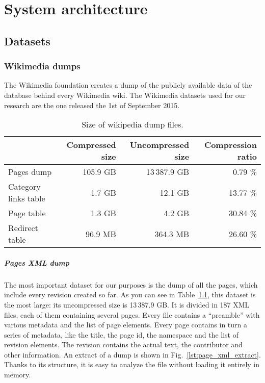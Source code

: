 
\chapter{System architecture}
\label{cha:system_architecture}

\section{Datasets}
\label{sec:datasets}

\subsection{Wikimedia dumps}
The Wikimedia foundation creates a dump of the publicly available data of the database behind every Wikimedia wiki.
The Wikimedia datasets used for our research are the one released the 1st of September 2015.


\begin{table}[]
\centering
\caption{Size of wikipedia dump files.}
\label{tbl:wikidumps_size}
\begin{tabular}{@{}lrrr@{}}
\multicolumn{1}{c}{\textbf{}} & \textbf{Compressed size} & \textbf{Uncompressed size} & \textbf{Compression ratio} \\ \midrule
Pages dump              &     105.9 GB &   13\,387.9 GB &  0.79 \% \\
Category links table    &       1.7 GB &        12.1 GB & 13.77 \% \\
Page table              &       1.3 GB &         4.2 GB & 30.84 \% \\
Redirect table          &      96.9 MB &       364.3 MB & 26.60 \%
\end{tabular}
\end{table}

\paragraph{Pages XML dump}
The most important dataset for our purposes is the dump of all the pages, which include every revision created so far.
As you can see in Table~\ref{tbl:wikidumps_size}, this dataset is the most large: its uncompressed size is 13\,387.9 GB\@.
It is divided in 187 XML files, each of them containing several pages.
Every file contains a ``preamble'' with various metadata and the list of page elements.
Every page contains in turn a series of metadata, like the title, the page id, the namespace and the list of revision elements.
The revision contains the actual text, the contributor and other information.
An extract of a dump is shown in Fig.~\ref{lst:page_xml_extract}.
Thanks to its structure, it is easy to analyze the file without loading it entirely in memory.

